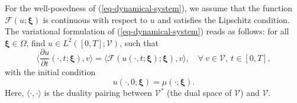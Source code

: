 \documentclass[10pt,a4paper]{article}
\numberwithin{equation}{section}
\numberwithin{lemma}{section}
\numberwithin{example}{section}
\numberwithin{definition}{section}
\numberwithin{assumption}{section}
\numberwithin{theorem}{section}
\numberwithin{proposition}{section}
\numberwithin{corollary}{section}
\numberwithin{remark}{section}
\begin{document}
For the well-posedness of (\ref{eq-dynamical-system}), we assume that the function $\mathcal{F}(u;\bm{\xi})$ is continuous with respect to $u$ and satisfies the Lipschitz condition.	
The variational formulation of (\ref{eq-dynamical-system}) reads as follows: {for all  $\bm{\xi}\in\Omega$, find $u\in L^2([0,T];\mathcal{V})$, such that}
\begin{equation}
\label{eq-varia}
\Big\langle \frac{\partial u}{\partial t}(\cdot,t;\bm{\xi}),v\Big\rangle=\langle \mathcal{F}(u(\cdot,t;\bm{\xi});\bm{\xi}),v\rangle,
\quad  \forall~ v\in \mathcal{V},~t\in [0,T],
\end{equation}
with the initial condition
\begin{equation}
\label{originalinitial}
u(\cdot ,0;\bm{\xi})=\mu(\cdot;\bm{\xi}).
\end{equation}
Here, $\langle \cdot , \cdot \rangle $ is the duality pairing between $\mathcal{V}^{*}$ (the dual space of $\mathcal{V}$) and $\mathcal{V}$.
\end{document}
